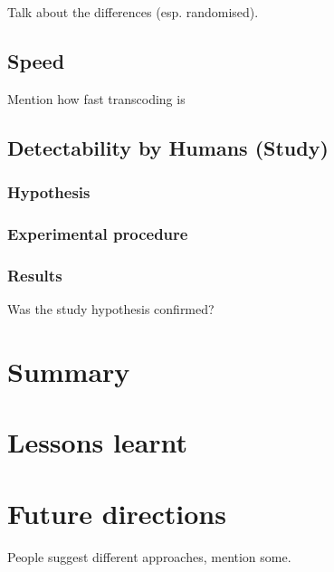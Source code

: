 \documentclass[12pt,british,twoside,notitlepage,usenames,dvipsnames,hypens,final]{report}
\numberwithin{equation}{section}
\numberwithin{figure}{section}
\begin{document}
Talk about the differences (esp. randomised).

\subsection{Speed}

Mention how fast transcoding is

\subsection{Detectability by Humans (Study)}

\subsubsection{Hypothesis}

\subsubsection{Experimental procedure}

\subsubsection{Results}

Was the study hypothesis confirmed?


\section{Summary}

\section{Lessons learnt}

\section{Future directions}

People suggest different approaches, mention some.

\cleardoublepage


\end{document}
